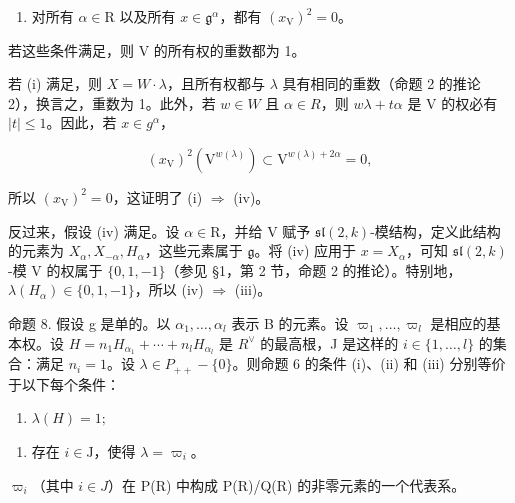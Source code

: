 \begin{enumerate}
\def\labelenumi{(\roman{enumi})}
\setcounter{enumi}{3}
\tightlist
\item
  对所有 \(\alpha \in \mathrm{R}\) 以及所有 \(x \in \mathfrak{g}^{\alpha}\)，都有 \((x_{\mathrm{V}})^2 = 0\)。
\end{enumerate}

若这些条件满足，则 V 的所有权的重数都为 1。

若 (i) 满足，则 \(X = W \cdot \lambda\)，且所有权都与 \(\lambda\) 具有相同的重数（命题 2 的推论 2），换言之，重数为 1。此外，若 \(w \in W\) 且 \(\alpha \in R\)，则 \(w\lambda + t\alpha\) 是 V 的权必有 \(|t| \leq 1\)。因此，若 \(x \in g^{\alpha}\)，

\[
(x _ {\mathrm{V}}) ^ {2} (\mathrm{V} ^ {w (\lambda)}) \subset \mathrm{V} ^ {w (\lambda) + 2 \alpha} = 0,
\]

所以 \((x_{\mathrm{V}})^2 = 0\)，这证明了 (i) \(\Longrightarrow\) (iv)。

反过来，假设 (iv) 满足。设 \(\alpha \in \mathrm{R}\)，并给 V 赋予 \(\mathfrak{sl}(2,k)\)-模结构，定义此结构的元素为 \(X_{\alpha}, X_{-\alpha}, H_{\alpha}\)，这些元素属于 \(\mathfrak{g}\)。将 (iv) 应用于 \(x = X_{\alpha}\)，可知 \(\mathfrak{sl}(2,k)\)-模 V 的权属于 \(\{0,1,-1\}\)（参见 §1，第 2 节，命题 2 的推论）。特别地，\(\lambda(H_{\alpha}) \in \{0,1,-1\}\)，所以 (iv) \(\Longrightarrow\) (iii)。

命题 8. 假设 g 是单的。以 \(\alpha_{1},\ldots,\alpha_{l}\) 表示 B 的元素。设 \(\varpi_{1},\ldots,\varpi_{l}\) 是相应的基本权。设 \(H = n_{1}H_{\alpha_{1}} + \cdots + n_{l}H_{\alpha_{l}}\) 是 \(R^{\vee}\) 的最高根，J 是这样的 \(i \in \{1,\ldots,l\}\) 的集合：满足 \(n_{i} = 1\)。设 \(\lambda \in P_{++} - \{0\}\)。则命题 6 的条件 (i)、(ii) 和 (iii) 分别等价于以下每个条件：

\begin{enumerate}
\def\labelenumi{(\alph{enumi})}
\setcounter{enumi}{21}
\tightlist
\item
  \(\lambda(H)=1;\)
\end{enumerate}

\begin{enumerate}
\def\labelenumi{(\roman{enumi})}
\setcounter{enumi}{5}
\tightlist
\item
  存在 \(i \in \mathrm{J}\)，使得 \(\lambda = \varpi_i\)。
\end{enumerate}

\(\varpi_{i}\)（其中 \(i \in J\)）在 P(R) 中构成 P(R)/Q(R) 的非零元素的一个代表系。

